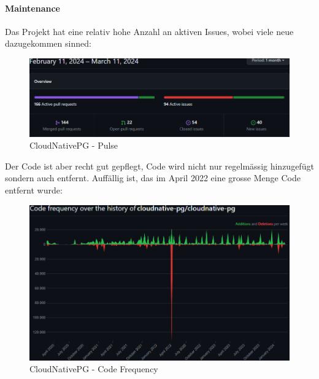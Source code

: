 \begin{flushleft}
    \paragraph{Maintenance}
    Das Projekt hat eine relativ hohe Anzahl an aktiven Issues, wobei viele neue dazugekommen sinned:
    \begin{figure}[H]
        \centering
        \includegraphics[width=0.75\linewidth]{source/implementation/evaluation/postgresql_ha_solutions/insights/cloudnativepg/pulse_cloudnative-pg_cloudnative-pg}
        \caption{CloudNativePG - Pulse}
        \label{fig:pulse_cloudnative-pg_cloudnative-pg}
    \end{figure}

    Der Code ist aber recht gut gepflegt, Code wird nicht nur regelmässig hinzugefügt sondern auch entfernt.
    Auffällig ist, das im April 2022 eine grosse Menge Code entfernt wurde:
    \begin{figure}[H]
        \centering
        \includegraphics[width=0.75\linewidth]{source/implementation/evaluation/postgresql_ha_solutions/insights/cloudnativepg/code_frequency_cloudnative-pg_cloudnative-pg}
        \caption{CloudNativePG - Code Frequency}
        \label{fig:code_frequency_cloudnative-pg_cloudnative-pg}
    \end{figure}


\end{flushleft}
